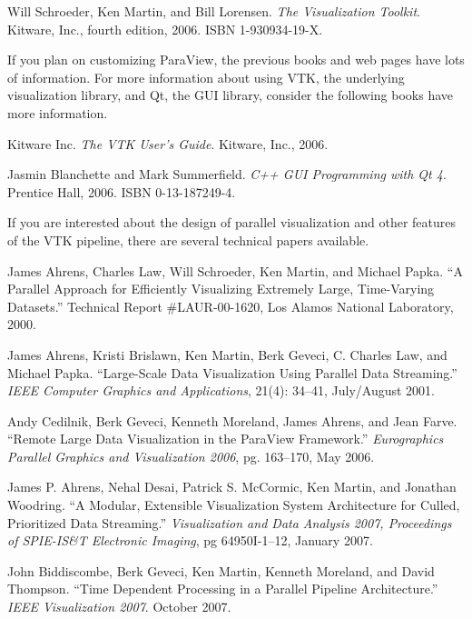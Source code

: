 \begin{reflist}
\item Will Schroeder, Ken Martin, and Bill Lorensen.  \emph{The
  Visualization Toolkit}.  Kitware, Inc., fourth edition, 2006.  ISBN
  1-930934-19-X.
\end{reflist}

If you plan on customizing ParaView, the previous books and web pages have
lots of information.  For more information about using VTK, the underlying
visualization library, and Qt, the GUI library, consider the following
books have more information.

\begin{reflist}
\item Kitware Inc.  \emph{The VTK User's Guide}.  Kitware, Inc., 2006.
\item Jasmin Blanchette and Mark Summerfield.  \emph{C++ GUI Programming
  with Qt 4}.  Prentice Hall, 2006.  ISBN 0-13-187249-4.
\end{reflist}

If you are interested about the design of parallel visualization and other
features of the VTK pipeline, there are several technical papers available.

\begin{reflist}
\item James Ahrens, Charles Law, Will Schroeder, Ken Martin, and Michael
  Papka.  ``A Parallel Approach for Efficiently Visualizing Extremely Large,
  Time-Varying Datasets.''  Technical Report \#LAUR-00-1620, Los Alamos
  National Laboratory, 2000.
\item James Ahrens, Kristi Brislawn, Ken Martin, Berk Geveci, C. Charles
  Law, and Michael Papka.  ``Large-Scale Data Visualization Using Parallel
  Data Streaming.''  \emph{IEEE Computer Graphics and Applications}, 21(4):
  34–41, July/August 2001.
\item Andy Cedilnik, Berk Geveci, Kenneth Moreland, James Ahrens, and Jean
  Farve.  ``Remote Large Data Visualization in the ParaView Framework.''
  \emph{Eurographics Parallel Graphics and Visualization 2006},
  pg. 163–170, May 2006.
\item James P. Ahrens, Nehal Desai, Patrick S. McCormic, Ken Martin, and
  Jonathan Woodring.  ``A Modular, Extensible Visualization System
  Architecture for Culled, Prioritized Data Streaming.''
  \emph{Visualization and Data Analysis 2007, Proceedings of SPIE-IS\&T
    Electronic Imaging}, pg 64950I-1–12, January 2007.
\item John Biddiscombe, Berk Geveci, Ken Martin, Kenneth Moreland, and
  David Thompson.  ``Time Dependent Processing in a Parallel Pipeline
  Architecture.'' \emph{IEEE Visualization 2007}.  October 2007.
\end{reflist}

